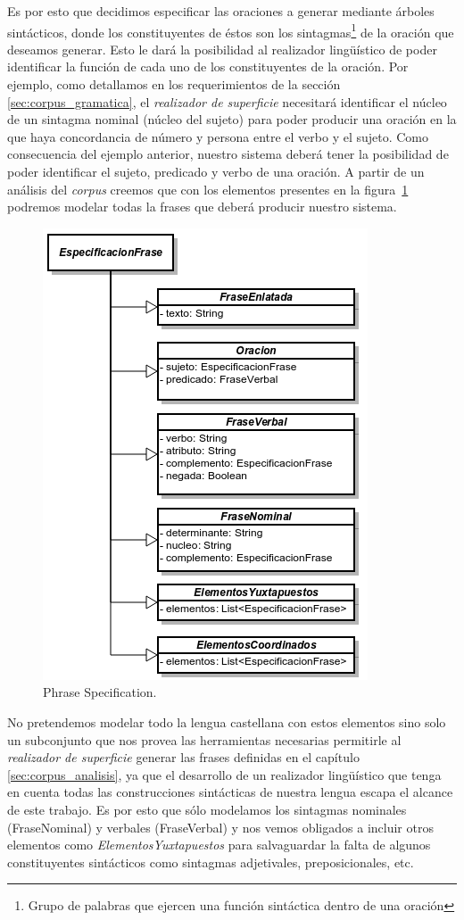 Es por esto que decidimos especificar las oraciones a generar mediante árboles sintácticos, donde los constituyentes de éstos son los sintagmas\footnote{Grupo de palabras que ejercen una función sintáctica dentro de una oración} de la oración que deseamos generar. Esto le dará la posibilidad al realizador lingüístico de poder identificar la función de cada uno de los constituyentes de la oración. Por ejemplo, como detallamos en los requerimientos de la sección \ref{sec:corpus_gramatica}, el \emph{realizador de superficie} necesitará identificar el núcleo de un sintagma nominal (núcleo del sujeto) para poder producir una oración en la que haya concordancia de número y persona entre el verbo y el sujeto. Como consecuencia del ejemplo anterior, nuestro sistema deberá tener la posibilidad de poder identificar el sujeto, predicado y verbo de una oración. A partir de un análisis del \emph{corpus} creemos que con los elementos presentes en la figura~\ref{fig:phase_spec} podremos modelar todas la frases que deberá producir nuestro sistema.

\begin{figure}[H]
  	\centering
	\includegraphics[scale=0.7]{img/phrase_spec.png}
	\caption{Phrase Specification.}
  	\label{fig:phase_spec}
\end{figure}

No pretendemos modelar todo la lengua castellana con estos elementos sino solo un subconjunto que nos provea las herramientas necesarias permitirle al \emph{realizador de superficie} generar las frases definidas en el capítulo \ref{sec:corpus_analisis}, ya que el desarrollo de un realizador lingüístico que tenga en cuenta todas las construcciones sintácticas de nuestra lengua escapa el alcance de este trabajo. Es por esto que sólo modelamos los sintagmas nominales (FraseNominal) y verbales (FraseVerbal) y nos vemos obligados a incluir otros elementos como \emph{ElementosYuxtapuestos} para salvaguardar la falta de algunos constituyentes sintácticos como sintagmas adjetivales, preposicionales, etc. 

